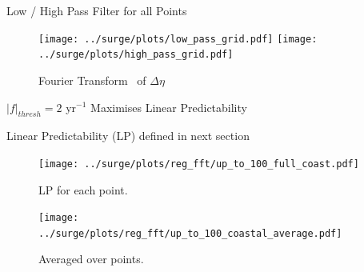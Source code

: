 \documentclass[usenames, dvipsnames]{beamer}
\begin{document}
\begin{frame}{Low / High Pass Filter for all Points}
\vspace{-30pt}
\hspace{-30pt}
 \begin{minipage}{1.15\textwidth}
\begin{figure}[htb!]
    \centering
   \hspace{-40pt} \texttt{[image: ../surge/plots/low\_pass\_grid.pdf]}
        \texttt{[image: ../surge/plots/high\_pass\_grid.pdf]}
    \vspace{-7pt}
    \caption{Fourier Transform~\cite{cooley1965algorithm} of $\Delta\eta$}
    \label{fig:A}
\end{figure}
\end{minipage}
\end{frame}


\begin{frame}{$|f|_{thresh}=2$ yr$^{-1}$ Maximises Linear Predictability }
\centering

Linear Predictability (LP) defined in next section

    \hspace{-30pt}\begin{minipage}{0.57\textwidth}
    \begin{figure}
            \texttt{[image: ../surge/plots/reg\_fft/up\_to\_100\_full\_coast.pdf]}
                \caption{LP for each point.}
    \end{figure}

    \end{minipage}\hspace{5pt}
      \begin{minipage}{0.45\textwidth}
\begin{figure}[htb!]
    \centering
    \texttt{[image: ../surge/plots/reg\_fft/up\_to\_100\_coastal\_average.pdf]}
    \caption{Averaged over points.}
    \label{fig:}
\end{figure}
    \end{minipage}
\end{frame}
\end{document}
